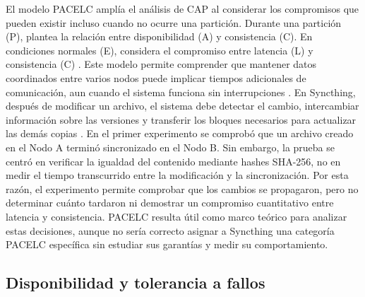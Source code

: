 \documentclass[12pt,a4paper]{article}
\begin{document}
El modelo PACELC amplía el análisis de CAP al considerar los compromisos que pueden existir incluso cuando no ocurre una partición. Durante una partición (P), plantea la relación entre disponibilidad (A) y consistencia (C). En condiciones normales (E), considera el compromiso entre latencia (L) y consistencia (C) \cite{ahmed2023}.
Este modelo permite comprender que mantener datos coordinados entre varios nodos puede implicar tiempos adicionales de comunicación, aun cuando el sistema funciona sin interrupciones \cite{ahmed2023,lee2023}.
En Syncthing, después de modificar un archivo, el sistema debe detectar el cambio, intercambiar información sobre las versiones y transferir los bloques necesarios para actualizar las demás copias \cite{syncthingSyncing,syncthingBEP}.
En el primer experimento se comprobó que un archivo creado en el Nodo A terminó sincronizado en el Nodo B. Sin embargo, la prueba se centró en verificar la igualdad del contenido mediante hashes SHA-256, no en medir el tiempo transcurrido entre la modificación y la sincronización.
Por esta razón, el experimento permite comprobar que los cambios se propagaron, pero no determinar cuánto tardaron ni demostrar un compromiso cuantitativo entre latencia y consistencia. PACELC resulta útil como marco teórico para analizar estas decisiones, aunque no sería correcto asignar a Syncthing una categoría PACELC específica sin estudiar sus garantías y medir su comportamiento.
\subsection{Disponibilidad y tolerancia a fallos}
\end{document}
